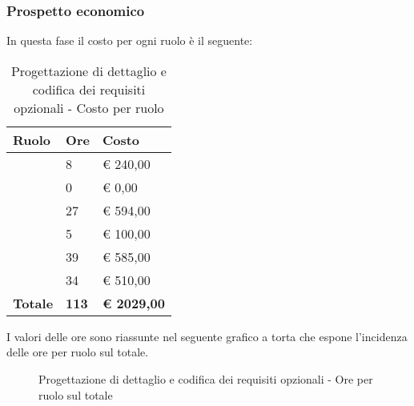 		\subsubsection{Prospetto economico} %
		\label{ssub:prospetto_economico}
		In questa fase il costo per ogni ruolo è il seguente: \\
				\begin{table}[!ht]
					\begin{center}
						\begin{tabularx}{0.65\textwidth}{|l|l|X|}
							\hline
							\textbf{Ruolo} & \textbf{Ore} & \textbf{Costo} \\
							\hline
							\roleProjectManager & 8 & \euro{} 240,00 \\
							\hline
							\roleAnalyst & 0 & \euro{} 0,00 \\
							\hline
							\roleDesigner & 27 & \euro{} 594,00 \\
							\hline
							\roleAdministrator & 5 & \euro{} 100,00 \\
							\hline
							\roleProgrammer & 39 & \euro{} 585,00 \\
							\hline
							\roleVerifier & 34 & \euro{} 510,00 \\
							\hline
							\textbf{Totale} & \textbf{113} & \textbf{\euro{} 2029,00} \\
							\hline
						\end{tabularx}
					\end{center}
				\caption{Progettazione di dettaglio e codifica dei requisiti opzionali - Costo per ruolo}
				\end{table}

				\noindent
				I valori delle ore sono riassunte nel seguente grafico a torta che espone l’incidenza delle ore per ruolo sul totale.
				\begin{center}
					\begin{figure}[htbp]
					\vspace{0.8cm}
					\caption{Progettazione di dettaglio e codifica dei requisiti opzionali - Ore per ruolo sul totale}
					\end{figure}
				\end{center}

